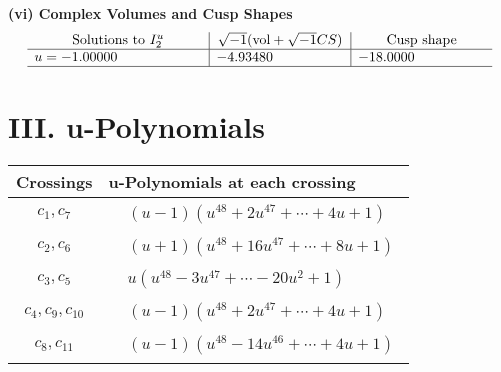 \documentclass[1p]{elsarticle_modified}
\theoremstyle{definition}
\newcommand{\I}{\sqrt{-1}}
\begin{document}
\newpage\flushleft \textbf{(vi) Complex Volumes and Cusp Shapes}
$$\begin{array}{c|c|c}  
\text{Solutions to }I^u_{2}& \I (\text{vol} + \sqrt{-1}CS) & \text{Cusp shape}\\
 \hline 
\begin{aligned}
u &= -1.00000\phantom{ +0.000000I}\end{aligned}
 & -4.93480\phantom{ +0.000000I} & -18.0000\phantom{ +0.000000I}\\
 \hline 
 \end{array}$$\newpage
\newpage\renewcommand{\arraystretch}{1}
\centering \section*{ III. u-Polynomials}
\begin{tabular}{m{50pt}|m{274pt}}
Crossings & \hspace{64pt}u-Polynomials at each crossing \\
\hline $$\begin{aligned}c_{1},c_{7}\end{aligned}$$&$\begin{aligned}
&(u-1)(u^{48}+2 u^{47}+\cdots+4 u+1)
\end{aligned}$\\
\hline $$\begin{aligned}c_{2},c_{6}\end{aligned}$$&$\begin{aligned}
&(u+1)(u^{48}+16 u^{47}+\cdots+8 u+1)
\end{aligned}$\\
\hline $$\begin{aligned}c_{3},c_{5}\end{aligned}$$&$\begin{aligned}
&u(u^{48}-3 u^{47}+\cdots-20 u^2+1)
\end{aligned}$\\
\hline $$\begin{aligned}c_{4},c_{9},c_{10}\end{aligned}$$&$\begin{aligned}
&(u-1)(u^{48}+2 u^{47}+\cdots+4 u+1)
\end{aligned}$\\
\hline $$\begin{aligned}c_{8},c_{11}\end{aligned}$$&$\begin{aligned}
&(u-1)(u^{48}-14 u^{46}+\cdots+4 u+1)
\end{aligned}$\\
\hline
\end{tabular}\newpage\renewcommand{\arraystretch}{1}
\end{document}

